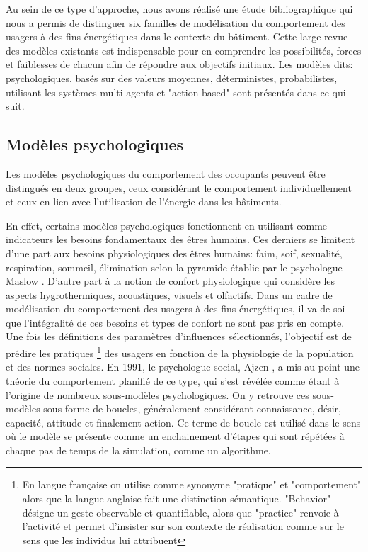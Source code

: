 Au sein de ce type d'approche, nous avons réalisé une étude bibliographique qui nous a permis de distinguer six familles de modélisation du comportement des usagers à des fins énergétiques dans le contexte du bâtiment. Cette large revue des modèles existants est indispensable pour en comprendre les possibilités, forces et faiblesses de chacun afin de répondre aux objectifs initiaux. Les modèles dits: psychologiques, basés sur des valeurs moyennes, déterministes, probabilistes, utilisant les systèmes multi-agents et "action-based" sont présentés dans ce qui suit.

\subsection{Modèles psychologiques}

Les modèles psychologiques du comportement des occupants peuvent être distingués en deux groupes, ceux considérant le comportement individuellement et ceux en lien avec l'utilisation de l'énergie dans les bâtiments.

En effet, certains modèles psychologiques fonctionnent en utilisant comme indicateurs les besoins fondamentaux des êtres humains. Ces derniers se limitent d'une part aux besoins physiologiques des êtres humains: faim, soif, sexualité, respiration, sommeil, élimination selon la pyramide établie par le psychologue Maslow \cite{Maslow-56}. D'autre part à la notion de confort physiologique qui considère les aspects hygrothermiques, acoustiques, visuels et olfactifs. Dans un cadre de modélisation du comportement des usagers à des fins énergétiques, il va de soi que l'intégralité de ces besoins et types de confort ne sont pas pris en compte. 
Une fois les définitions des paramètres d'influences sélectionnés, l'objectif est de prédire les pratiques \footnote{En langue française on utilise comme synonyme "pratique" et "comportement" alors que la langue anglaise fait une distinction sémantique. "Behavior" désigne un geste observable et quantifiable, alors que "practice" renvoie à l'activité et permet d'insister sur son contexte de réalisation comme sur le sens que les individus lui attribuent} des usagers en fonction de la physiologie de la population et des normes sociales. En 1991, le psychologue social, Ajzen \cite{Ajzen-91}, a mis au point une théorie du comportement planifié de ce type, qui s'est révélée comme étant à l'origine de nombreux sous-modèles psychologiques. On y retrouve ces sous-modèles sous forme de boucles, généralement considérant connaissance, désir, capacité, attitude et finalement action. Ce terme de boucle est utilisé dans le sens où le modèle se présente comme un enchainement d'étapes qui sont répétées à chaque pas de temps de la simulation, comme un algorithme.

